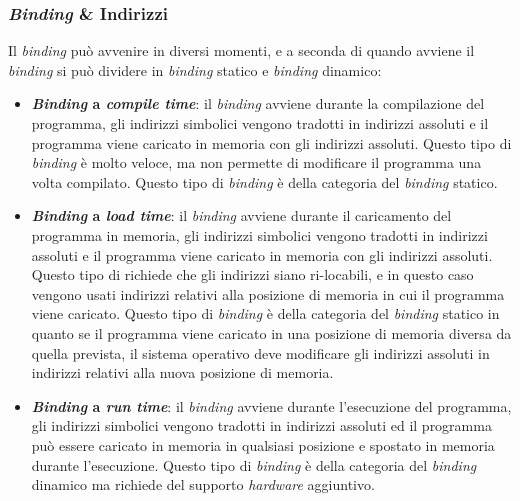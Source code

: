         \subsubsection{\textit{Binding} \& Indirizzi}
            Il \textit{binding} può avvenire in diversi momenti, e a seconda di quando avviene il \textit{binding} si può dividere in \textit{binding} statico e \textit{binding} dinamico:
            \begin{itemize}
                \item \textbf{\textit{Binding} a \textit{compile time}}: il \textit{binding} avviene durante la compilazione del programma, gli indirizzi simbolici vengono tradotti in indirizzi assoluti e il programma viene caricato in memoria con gli indirizzi assoluti. Questo tipo di \textit{binding} è molto veloce, ma non permette di modificare il programma una volta compilato. Questo tipo di \textit{binding} è della categoria del \textit{binding} statico.
                \item \textbf{\textit{Binding} a \textit{load time}}: il \textit{binding} avviene durante il caricamento del programma in memoria, gli indirizzi simbolici vengono tradotti in indirizzi assoluti e il programma viene caricato in memoria con gli indirizzi assoluti. Questo tipo di  richiede che gli indirizzi siano ri-locabili, e in questo caso vengono usati indirizzi relativi alla posizione di memoria in cui il programma viene caricato. Questo tipo di \textit{binding} è della categoria del \textit{binding} statico in quanto se il programma viene caricato in una posizione di memoria diversa da quella prevista, il sistema operativo deve modificare gli indirizzi assoluti in indirizzi relativi alla nuova posizione di memoria.
                \item \textbf{\textit{Binding} a \textit{run time}}: il \textit{binding} avviene durante l'esecuzione del programma, gli indirizzi simbolici vengono tradotti in indirizzi assoluti ed il programma può essere caricato in memoria in qualsiasi posizione e spostato in memoria durante l'esecuzione. Questo tipo di \textit{binding} è della categoria del \textit{binding} dinamico ma richiede del supporto \textit{hardware} aggiuntivo.
            \end{itemize}
